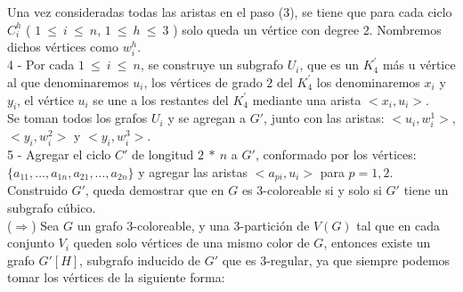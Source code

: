 \documentclass{article}
\begin{document}
Una vez consideradas todas las aristas en el paso (3), se tiene que para cada ciclo $C_i^h$ ( $1~\leq ~i ~\leq~ n$, $1~\leq ~h ~\leq~ 3$ )
solo queda un v\'ertice con degree $2$. Nombremos dichos v\'ertices como $w_i^h$.\\ 

4 - Por cada $1~\leq ~i ~\leq~ n$, se construye un subgrafo $U_i$, que es un $K^{'}_4$ m\'as u v\'ertice al que denominaremos $u_{i}$, los v\'ertices de grado $2$ del $K^{'}_4$
los denominaremos $x_{i}$ y $y_{i}$, el v\'ertice $u_i$ se une a los restantes del  $K^{'}_4$ mediante una arista $<x_{i},u_i>$.\\ 

Se toman todos los grafos $U_i$ y se agregan a $G'$, junto con las aristas: $<u_i, w_i^1>$, $<y_i, w_i^2>$ y $<y_i, w_i^3>$. \\

5 - Agregar el ciclo $C'$ de longitud $2~*~n$ a $G'$, conformado por los v\'ertices: $\{ a_{11}, ... , a_{1n}, a_{21}, ... , a_{2n} \}$ y agregar las aristas 
$<a_{pi}, u_{i}>$ para $p = 1,2$.\\

Construido $G'$, queda demostrar que en $G$ es $3$-coloreable si y solo si $G'$ tiene un subgrafo c\'ubico. \\ 

($\Rightarrow$) Sea $G$ un grafo $3$-coloreable, y una $3$-partici\'on de $V(G)$ tal que en cada conjunto $V_i$ queden solo v\'ertices de una mismo 
color de $G$, entonces existe un grafo $G'[H]$, subgrafo inducido de $G'$ que es $3$-regular, ya que siempre podemos tomar los v\'ertices de la siguiente forma:\\
\end{document}
